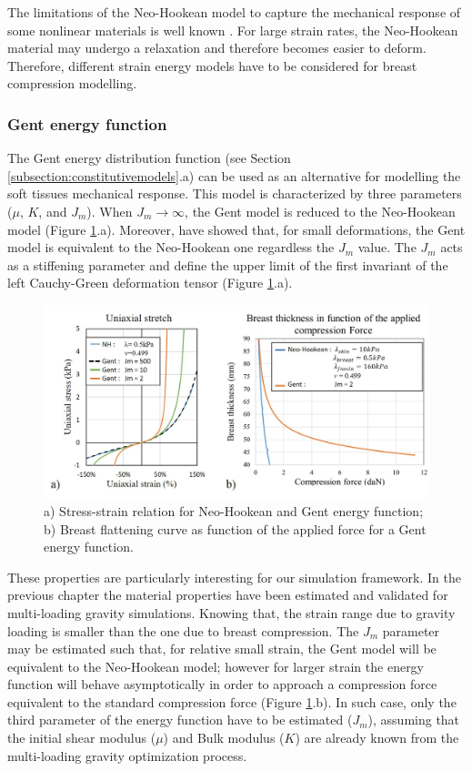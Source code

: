 The limitations of the Neo-Hookean model to capture the mechanical response of some nonlinear materials is well known \citep{kaliske_finite_1997}. For large strain rates, the Neo-Hookean material may undergo a relaxation and therefore becomes easier to deform. Therefore, different strain energy models have to be considered for breast compression modelling.

\subsubsection*{Gent energy function}

The Gent energy distribution function (see Section \ref{subsection:constitutivemodels}.a)  can be used as an alternative for modelling the soft tissues mechanical response. This model is characterized by three parameters ($\mu$, $K$, and $J_m$). When $J_m \longrightarrow \infty$, the Gent model is reduced to the Neo-Hookean model (Figure \ref{fig:GentvsNeoStrain}.a). Moreover, \citep{chagnon_comparison_2004} have showed that, for small deformations, the Gent model is equivalent to the Neo-Hookean one regardless the $J_m$ value. The $J_m$ acts as a stiffening parameter and define the upper limit of the first invariant of the left Cauchy-Green deformation tensor (Figure \ref{fig:GentvsNeoStrain}.a). 
 
\begin{figure}[!h]
\centering
\includegraphics[width=1\textwidth,keepaspectratio]{figures/GentvsNeoStrain.jpg} 
\caption{a) Stress-strain relation for Neo-Hookean and Gent energy function; b) Breast flattening curve as function of the applied force for a Gent energy function.}
\label{fig:GentvsNeoStrain}
\end{figure}

These properties are particularly interesting for our simulation framework. In the previous chapter the material properties have been estimated and validated for multi-loading gravity simulations. Knowing that, the strain range due to gravity loading is smaller than the one due to breast compression. The $J_m$ parameter may be estimated such that, for relative small strain, the Gent model will be equivalent to the Neo-Hookean model; however for larger strain  the energy function will behave asymptotically in order to approach a compression force equivalent to the standard compression force (Figure \ref{fig:GentvsNeoStrain}.b). In such case, only the third parameter of the energy function have to be estimated ($J_m$), assuming that the initial shear modulus ($\mu$) and Bulk modulus ($K$) are already known from the multi-loading gravity optimization process.


